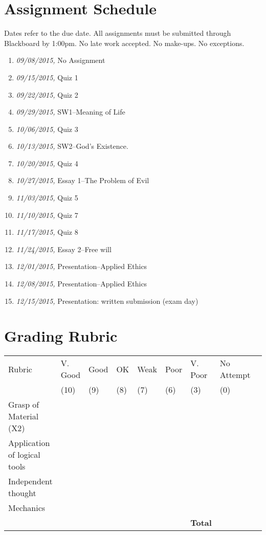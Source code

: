 \documentclass[11pt,article,oneside]{memoir}
\begin{document}
\section{Assignment Schedule}
Dates refer to the due date. All assignments must be submitted through Blackboard by 1:00pm. No late work accepted. No make-ups. No exceptions. 

\begin{enumerate}
\item \textit{09/08/2015,} No Assignment
\item \textit{09/15/2015,} Quiz 1 
\item \textit{09/22/2015,} Quiz 2
\item \textit{09/29/2015,} SW1--Meaning of Life 
\item \textit{10/06/2015,} Quiz 3
\item \textit{10/13/2015,} SW2--God's Existence.
\item \textit{10/20/2015,} Quiz 4
\item \textit{10/27/2015,} Essay 1--The Problem of Evil
\item \textit{11/03/2015,} Quiz 5
\item \textit{11/10/2015,} Quiz 7 
\item \textit{11/17/2015,} Quiz 8
\item \textit{11/24/2015,} Essay 2--Free will
\item \textit{12/01/2015,} Presentation--Applied Ethics
\item \textit{12/08/2015,} Presentation--Applied Ethics
\item \textit{12/15/2015,} Presentation: written submission (exam day)
\end{enumerate}

\newpage
\section{Grading Rubric}

\begin{center}


\resizebox{14cm}{!} {
    \begin{tabular}{ | l | l | l | l | l | l | l | l | l |    }
    \hline
    Rubric &  V. Good & Good & OK & Weak & Poor & V. Poor & No Attempt \\  
	 & (10) & (9) & (8) & (7) & (6) & (3)  & (0) \\    \hline
    Grasp of Material (X2) & & & & & & &\\ \hline   
    Application of logical tools &  & & & & & &\\ \hline
	Independent thought &  & & & & & &\\ \hline
 Mechanics & & & & & &  &\\ \hline \hline
 & &  & & &  & \textbf{Total}  & \\ \hline
    \end{tabular}
}


\end{center}




\end{document}
